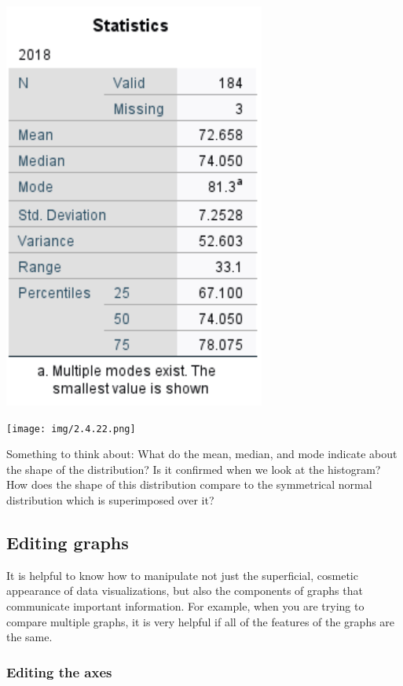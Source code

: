 \documentclass[
]{book}
\begin{document}
\includegraphics{img/2.4.21.png}

\texttt{[image: img/2.4.22.png]}

Something to think about: What do the mean, median, and mode indicate about the shape of the distribution? Is it confirmed when we look at the histogram? How does the shape of this distribution compare to the symmetrical normal distribution which is superimposed over it?

\hypertarget{editing-graphs}{%
\subsection{Editing graphs}\label{editing-graphs}}

It is helpful to know how to manipulate not just the superficial, cosmetic appearance of data visualizations, but also the components of graphs that communicate important information. For example, when you are trying to compare multiple graphs, it is very helpful if all of the features of the graphs are the same.

\hypertarget{editing-the-axes}{%
\subsubsection{Editing the axes}\label{editing-the-axes}}
\end{document}
